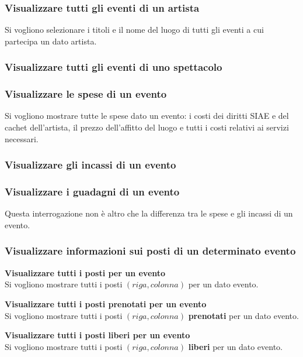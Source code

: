 \documentclass[a4paper,11pt]{article}
\begin{document}
\subsubsection{Visualizzare tutti gli eventi di un artista}
Si vogliono selezionare i titoli e il nome del luogo di tutti gli eventi a cui
partecipa un dato artista.


\subsubsection{Visualizzare tutti gli eventi di uno spettacolo}


\subsubsection{Visualizzare le spese di un evento}
Si vogliono mostrare tutte le spese dato un evento: i costi dei diritti SIAE e del
cachet dell'artista, il prezzo dell'affitto del luogo e tutti i costi relativi ai
servizi necessari.


\subsubsection{Visualizzare gli incassi di un evento}


\subsubsection{Visualizzare i guadagni di un evento}
Questa interrogazione non è altro che la differenza tra le spese e gli incassi di un evento.


\subsubsection{Visualizzare informazioni sui posti di un determinato evento}

\textbf{Visualizzare tutti i posti per un evento}\\
Si vogliono mostrare tutti i posti $(riga, colonna)$ per un dato evento.

\textbf{Visualizzare tutti i posti prenotati per un evento}\\
Si vogliono mostrare tutti i posti $(riga, colonna)$ \textbf{prenotati} per un dato evento.

\textbf{Visualizzare tutti i posti liberi per un evento}\\
Si vogliono mostrare tutti i posti $(riga, colonna)$ \textbf{liberi} per un dato evento.

\end{document}
